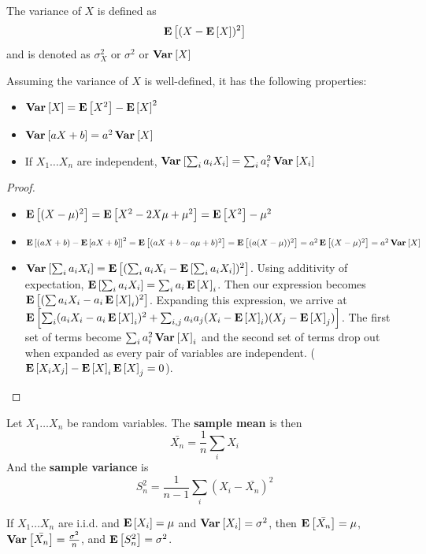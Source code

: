 \documentclass[10pt]{article}
\begin{document}
\begin{definition}
    The variance of $X$ is defined as 
    \[
        \E {(X - \E X)^2}
    \]
    and is denoted as $\sigma^2_X$ or $\sigma^2$ or $\Var X$
\end{definition}

\begin{theorem}
    Assuming the variance of $X$ is well-defined, it has the following
    properties:
    \begin{itemize}
        \item{$\Var X = \E{X^2} - \E{X}^2$}
        \item{$\Var {aX + b} = a^2 \Var X$}
        \item{If $X_1 \dots X_n$ are independent, $\Var{\sum_i a_i X_i} = \sum_i a_i^2 \Var{X_i}$}
    \end{itemize}
\end{theorem}

\begin{proof}
    \begin{itemize}
        \item{$\E{(X - \mu)^2} = \E{X^2 - 2 X \mu + \mu^2} = \E{X^2} - \mu^2$}
        \item{$\E {(aX + b) - \E{aX +b}}^2 = \E {(aX + b - a \mu + b)^2} = \E
            {(a(X - \mu))^2} = a^2 \E{(X - \mu)^2} = a^2 \Var X$}
        \item{$\Var {\sum_i a_i X_i} = \E {(\sum_i a_i X_i - \E {\sum_i a_i
            X_i})^2}$. Using additivity of expectation, $\E {\sum_i a_i X_i} =
        \sum_i a_i \E X_i$. Then our expression becomes $\E{ (\sum a_i X_i -
    a_i \E X_i)^2}$. Expanding this expression, we arrive at $\E {\sum_i
(a_iX_i - a_i\E X_i)^2 + \sum_{i, j} a_ia_j(X_i - \E X_i)(X_j - \E X_j)}$. The
first set of terms become $\sum_i a_i^2 \Var X_i$ and the second set of terms
drop out when expanded as every pair of variables are independent. ($\E{X_iX_j}
- \E X_i \E X_j = 0$).}
    \end{itemize}
\end{proof}

\begin{definition}
    Let $X_1 \dots X_n$ be random variables. The \textbf{sample mean} is then 
    \[\bar{X_n} = \frac{1}{n}\sum_i X_i\]
    And the \textbf{sample variance} is
    \[S^2_n = \frac{1}{n-1}\sum_i (X_i - \bar{X_n})^2\]
\end{definition}

\begin{theorem}
    If $X_1 \dots X_n$ are i.i.d. and $\E {X_i} = \mu$ and $\Var {X_i} = \sigma^2$,
    then $\E {\bar{X_n}} = \mu$, $\Var {\bar{X_n}} = \frac{\sigma^2}{n}$, and
    $\E {S^2_n} = \sigma^2$.
\end{theorem}
\end{document}
